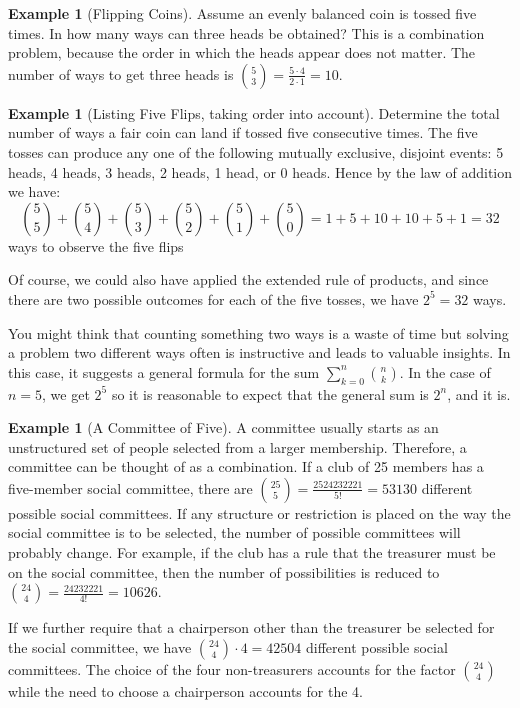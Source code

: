 \documentclass[10pt,]{book}
\theoremstyle{plain}
\theoremstyle{definition}
\theoremstyle{definition}
\newtheorem{example}[theorem]{Example}
\theoremstyle{definition}
\begin{document}
\begin{example}[Flipping Coins]\label{flipping-coins}
  Assume an evenly balanced coin is tossed five times. In how many ways can three heads be obtained? This is a combination problem, because the order in which the heads appear does not matter. The number of ways to get three heads is \(\binom{5}{3}= \frac{5 \cdot 4}{2 \cdot 1} = 10\).
%
\end{example}
\begin{example}[Listing Five Flips, taking order into account]\label{five-flips}
Determine the total number of ways a fair coin can land if tossed five consecutive times. The five tosses can produce any one of the following mutually exclusive, disjoint events: 5 heads, 4 heads, 3 heads, 2 heads, 1 head, or 0 heads. Hence by the law of addition we have:
\begin{equation*}\binom{5}{5}+\binom{5}{4}+\binom{5}{3}+\binom{5}{2}+\binom{5}{1}+\binom{5}{0}= 1 + 5 +10+10+5+1 = 32\end{equation*} ways to observe the five flips%
\par
 Of course, we could also have applied the extended rule of products, and since there are two possible outcomes for each of the five tosses, we have \(2^5 = 32\) ways.%
\end{example}
\par
You might think that counting something two ways is a waste of time but solving a problem two different ways often is instructive and leads to valuable insights. In this case, it suggests a general formula for the sum 
\(\sum_{k=0}^n \binom{n}{k}\). In the case of \(n = 5\), we get \(2^5\) so it is reasonable to expect that the general sum is \(2^n\), and it is.%
\begin{example}[A Committee of Five]\label{committee-of-five}
A committee usually starts as an unstructured set of people selected from a larger membership. Therefore, a committee can be thought of as a combination. If a club of 25 members has a five-member social committee, there are \(\binom{25}{5}=\frac{25 24 23 22 21}{5!} = 53130\) different possible social committees. If any structure or restriction is placed on the way the social committee is to be selected, the number of possible committees will probably change. For example, if the club has a rule that the treasurer must be on the social committee, then the number of possibilities is reduced to \(\binom{24}{4}=\frac{24 23 22 21}{4!} = 10626\). %
\par
 If we further require that a chairperson other than the treasurer be selected for the social committee, we have  \(\binom{24}{4} \cdot 4 = 42504\) different possible social committees. The choice of the four non-treasurers accounts for the factor \(\binom{24}{4}\) while the need to choose a chairperson accounts for the 4.%
\end{example}
\end{document}
